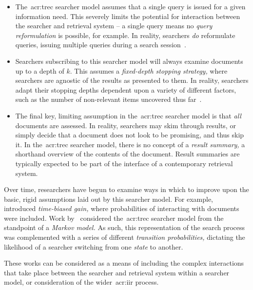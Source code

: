 \begin{itemize}
    \item{ The~\gls{acr:trec} searcher model assumes that a single query is issued for a given information need. This severely limits the potential for interaction between the searcher and retrieval system -- a single query means no \emph{query reformulation} is possible, for example. In reality, searchers \emph{do} reformulate queries, issuing multiple queries during a search session~\citep{keskustalo2009querying}.}
    \item{ Searchers subscribing to this searcher model will always examine documents up to a depth of $k$. This assumes a \emph{fixed-depth stopping strategy,} where searchers are agnostic of the results as presented to them. In reality, searchers adapt their stopping depths dependent upon a variety of different factors, such as the number of non-relevant items uncovered thus far~\citep{cooper1973retrieval_effectiveness_ii}.}
    \item{ The final key, limiting assumption in the~\gls{acr:trec} searcher model is that \emph{all} documents are assessed. In reality, searchers may skim through results, or simply decide that a document does not look to be promising, and thus skip it. In the~\gls{acr:trec} searcher model, there is no concept of a \emph{result summary,} a shorthand overview of the contents of the document. Result summaries are typically expected to be part of the interface of a contemporary retrieval system.}
\end{itemize}

Over time, researchers have begun to examine ways in which to improve upon the basic, rigid assumptions laid out by this searcher model. For example,~\cite{smucker2012tbg} introduced \emph{time-biased gain,} where probabilities of interacting with documents were included. Work by~\cite{tran2017markov_models} considered the~\gls{acr:trec} searcher model from the standpoint of a \emph{Markov model.} As such, this representation of the search process was complemented with a series of different \emph{transition probabilities,} dictating the likelihood of a searcher switching from one \emph{state} to another.

These works can be considered as a means of including the complex interactions that take place between the searcher and retrieval system within a searcher model, or consideration of the wider~\gls{acr:iir} process.

